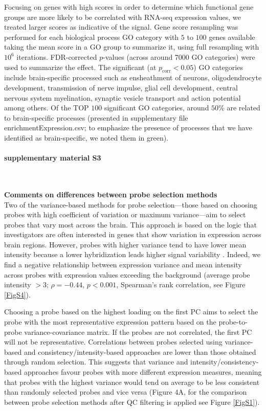\documentclass[10pt,A4]{article}
\begin{document}
Focusing on genes with high scores in order to determine which functional gene groups are more likely to be correlated with RNA-seq expression values, we treated larger scores as indicative of the signal. Gene score resampling was performed for each biological process GO category with $5$ to $100$ genes available taking the mean score in a GO group to summarize it, using full resampling with $10^{6}$ iterations. FDR-corrected $p$-values (across around \num{7000} GO categories) were used to summarize the effect. The significant (at $p_\mathrm{corr}<0.05$) GO categories include brain-specific processed such as ensheathment of neurons, oligodendrocyte development, transmission of nerve impulse, glial cell development, central nervous system myelination, synaptic vesicle transport and action potential among others. Of the TOP $100$ significant GO categories, around $50\%$ are related to brain-specific processes (presented in supplementary file enrichmentExpression.csv; to emphasize the presence of processes that we have identified as brain-specific, we noted them in green). 

\paragraph*{supplementary material S3}\mbox{}\\
\label{SItext3}

\textbf{Comments on differences between probe selection methods}\\
Two of the variance-based methods for probe selection—those based on choosing probes with high coefficient of variation or maximum variance—aim to select probes that vary most across the brain. This approach is based on the logic that investigators are often interested in genes that show variation in expression across brain regions. However, probes with higher variance tend to have lower mean intensity because a lower hybridization leads higher signal variability \citep{Quackenbush2002a}. Indeed, we find a negative relationship between expression variance and mean intensity across probes with expression values exceeding the background (average probe intensity $> 3$; $\rho = -0.44$, $p < 0.001$, Spearman’s rank correlation, see Figure \ref{FigS4}).

Choosing a probe based on the highest loading on the first PC aims to select the probe with the most representative expression pattern based on the probe-to-probe variance-covariance matrix. If the probes are not correlated, the first PC will not be representative. Correlations between probes selected using variance-based and consistency/intensity-based approaches are lower than those obtained through random selection. This suggests that variance and intensity/consistency-based approaches favour probes with more different expression measures, meaning that probes with the highest variance would tend on average to be less consistent than randomly selected probes and vice versa (Figure 4A, for the comparison between probe selection methods after QC filtering is applied see Figure \ref{FigS1}). 
 
\end{document}
